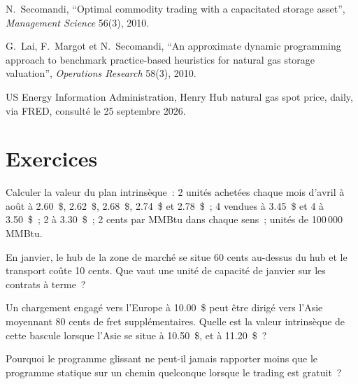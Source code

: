 \begin{omsources}
\item N.~Secomandi, ``Optimal commodity trading with a capacitated storage asset'', \emph{Management Science} 56(3), 2010.
\item G.~Lai, F.~Margot et N.~Secomandi, ``An approximate dynamic programming approach to benchmark practice-based heuristics for natural gas
storage valuation'', \emph{Operations Research} 58(3), 2010.
\item US Energy Information Administration, Henry Hub natural gas spot price, daily, via FRED, consulté le 25 septembre 2026.
\end{omsources}

\section{Exercices}

\begin{exercise}[$\star$]\label{exo:s2:storage-transport-and-physical-optionality:1}
Calculer la valeur du plan intrinsèque~: 2 unités achetées chaque mois d'avril à août à 2.60~\$, 2.62~\$, 2.68~\$, 2.74~\$ et 2.78~\$~; 4 vendues à 3.45~\$ et
4 à 3.50~\$~; 2 à 3.30~\$~; 2 cents par MMBtu dans chaque sens~; unités de 100\,000 MMBtu.
\end{exercise}

\begin{exercise}[$\star$]\label{exo:s2:storage-transport-and-physical-optionality:2}
En janvier, le hub de la zone de marché se situe 60 cents au-dessus du hub et le transport coûte 10 cents. Que vaut une unité de capacité de janvier sur les contrats à terme~?
\end{exercise}

\begin{exercise}[$\star$]\label{exo:s2:storage-transport-and-physical-optionality:3}
Un chargement engagé vers l'Europe à 10.00~\$ peut être dirigé vers l'Asie moyennant 80 cents de fret supplémentaires. Quelle est la valeur intrinsèque de cette bascule lorsque l'Asie se situe à 10.50~\$,
et à 11.20~\$~?
\end{exercise}

\begin{exercise}[$\star\star$]\label{exo:s2:storage-transport-and-physical-optionality:4}
Pourquoi le programme glissant ne peut-il jamais rapporter moins que le programme statique sur un chemin quelconque lorsque le trading est gratuit~?
\end{exercise}

